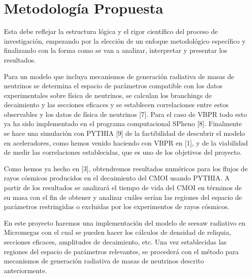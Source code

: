 \section{ Metodología Propuesta }
\begin{instrucciones}
  Esta debe reflejar la estructura lógica y el
rigor científico del proceso de investigación, empezando por la elección de un enfoque
metodológico específico y finalizando con la forma como se van a analizar, interpretar y presentar
los resultados.
\end{instrucciones}

Para un modelo que incluya mecanismos de generación radiativa de masas de neutrinos se determina el espacio de parámetros compatible con los datos experimentales sobre física de neutrinos, se calculan los branchings de decaimiento y las secciones eficaces y se establecen correlaciones entre estos observables y los datos de física de neutrinos [7]. Para el caso de VBPR todo esto ya ha sido implementado en el programa computacional SPheno [8]. Finalmente se hace una simulación con PYTHIA [9] de la factibilidad de descubrir el modelo en aceleradores, como hemos venido haciendo con VBPR en [1], y de la viabilidad de medir las correlaciones establecidas, que es uno de los objetivos del proyecto.

Como hemos ya hecho en [3], obtendremos resultados numéricos para los flujos de rayos cósmicos  producidos en el decaimiento del CMOI usando PYTHIA. A partir de los resultados se analizará el tiempo de vida del CMOI  en términos de su masa con el fin de obtener y analizar cuáles serían las regiones del espacio de parámetros restringidas o excluidas por los experimentos de rayos cósmicos.

En este proyecto haremos una implementación del modelo de seesaw radiativo en Micromegas  con el cual se pueden hacer los cálculos de densidad de reliquia, secciones eficaces, amplitudes de decaimiento, etc. Una vez establecidas las regiones del espacio de parámetros relevantes, se procederá con el método para mecanismos de generación radiativa de masas de neutrinos descrito anteriormente.


